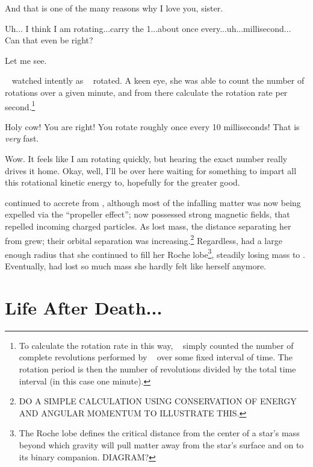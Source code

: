 \documentclass[main.tex]{subfiles}
\begin{document}
\par \Maia And that is one of the many reasons why I love you, sister.  

\par \Merope Uh... I think I am rotating...carry the 1...about once every...uh...millisecond... Can that even be right?

\par \Maia Let me see.

\par \nar \rmmaia~ watched intently as \rmmerope~ rotated.  A keen eye, she was able to count the number of rotations over a given minute, and from there calculate the rotation rate per second.\footnote{To calculate the rotation rate in this way, \rmmaia~  simply counted the number of complete revolutions performed by \rmerope~ over some fixed interval of time.  The rotation period is then the number of revolutions divided by the total time interval (in this case one minute).}

\par \Maia Holy cow!  You are right! You rotate roughly once every 10 milliseconds!  That is \textit{very} fast.  

\par \Merope Wow.  It feels like I am rotating quickly, but hearing the exact number really drives it home.  Okay, well, I'll be over here waiting for something to impart all this rotational kinetic energy to, hopefully for the greater good. 

\par \nar \rmmerope continued to accrete from \rmmaia, although most of the infalling matter was now being expelled via the ``propeller effect''; \rmmerope now possessed strong magnetic fields, that repelled incoming charged particles.  As \rmmaia lost mass, the distance separating her from \rmmerope grew; their orbital separation was increasing.\footnote{DO A SIMPLE CALCULATION USING CONSERVATION OF ENERGY AND ANGULAR MOMENTUM TO ILLUSTRATE THIS.}  Regardless, \rmmaia had a large enough radius that she continued to fill her Roche lobe\footnote{The Roche lobe defines the critical distance from the center of a star's mass beyond which gravity will pull matter away from the star's surface and on to its binary companion. DIAGRAM?}, steadily losing mass to \rmmerope.  Eventually, \rmmaia had lost so much mass she hardly felt like herself anymore.

\section{Life After Death...}
\end{document}
